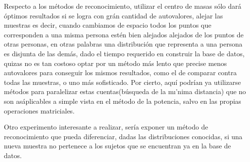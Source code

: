 Respecto a los m\'etodos de reconocimiento, utilizar el centro de masas s\'olo dar\'a \'optimos resultados si se logra con gr\'an cantidad de autovalores, alejar las muestras es decir, cuando cambiamos de espacio todos los puntos que corresponden a una misma persona est\'en bien alejados alejados de los puntos de otras personas, en otras palabras una distribuci\'on que representa a una persona es disjunta de las dem\'as, dado el tiempo requerido en construir la base de datos, quizas no es tan costoso optar por un m\'etodo m\'as lento que precise menos autovalores para conseguir los mismos resultados, como el de comparar contra todas las muestras, o uno m\'as sofisticado. Por cierto, aqu\'i podr\'ian ya utilizarse m\'etodos para paralelizar estas cuentas(b\'usqueda de la m\i'nima distancia) que no son as\' aplicables a simple vista en el m\'etodo de la potencia, salvo en las propias operaciones matriciales.

Otro experimento interesante a realizar, ser\'ia exponer un m\'etodo de reconocimiento que pueda diferenciar, dadas las distribuciones conocidas, si una nueva muestra no pertenece a los sujetos que se encuentran ya en la base de datos.

